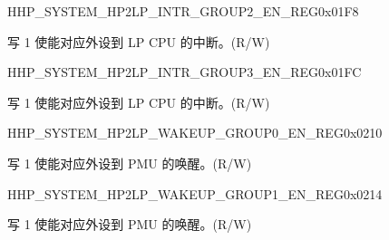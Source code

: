{\begin{register}{H}{HP\_SYSTEM\_HP2LP\_INTR\_GROUP2\_EN\_REG}{0x01F8}\label{regdesc:HPSYSTEMHP2LPINTRGROUP2ENREG}
%
\regnewline%
\begin{regdesc}\begin{reglist}
\label{fielddesc:HPSYSTEMH2LPINTRGROUP2EN}\item [HP\_SYSTEM\_H2LP\_INTR\_GROUP2\_EN] 写 1 使能对应外设到 LP CPU 的中断。(R/W)
\end{reglist}\end{regdesc}
\end{register}


\begin{register}{H}{HP\_SYSTEM\_HP2LP\_INTR\_GROUP3\_EN\_REG}{0x01FC}\label{regdesc:HPSYSTEMHP2LPINTRGROUP3ENREG}
%
%
\regnewline%
\begin{regdesc}\begin{reglist}
\label{fielddesc:HPSYSTEMH2LPINTRGROUP3EN}\item [HP\_SYSTEM\_H2LP\_INTR\_GROUP3\_EN] 写 1 使能对应外设到 LP CPU 的中断。(R/W)
\end{reglist}\end{regdesc}
\end{register}


\begin{register}{H}{HP\_SYSTEM\_HP2LP\_WAKEUP\_GROUP0\_EN\_REG}{0x0210}\label{regdesc:HPSYSTEMHP2LPWAKEUPGROUP0ENREG}
%
\regnewline%
\begin{regdesc}\begin{reglist}
\label{fielddesc:HPSYSTEMH2LPWAKEUPGROUP0EN}\item [HP\_SYSTEM\_H2LP\_WAKEUP\_GROUP0\_EN] 写 1 使能对应外设到 PMU 的唤醒。(R/W)
\end{reglist}\end{regdesc}
\end{register}


\begin{register}{H}{HP\_SYSTEM\_HP2LP\_WAKEUP\_GROUP1\_EN\_REG}{0x0214}\label{regdesc:HPSYSTEMHP2LPWAKEUPGROUP1ENREG}
%
\regnewline%
\begin{regdesc}\begin{reglist}
\label{fielddesc:HPSYSTEMH2LPWAKEUPGROUP1EN}\item [HP\_SYSTEM\_H2LP\_WAKEUP\_GROUP1\_EN] 写 1 使能对应外设到 PMU 的唤醒。(R/W)
\end{reglist}\end{regdesc}
\end{register}


}
